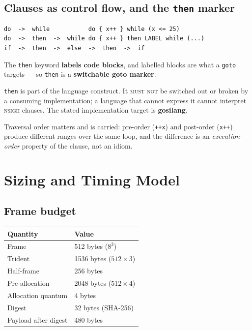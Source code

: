 \documentclass[11pt,a4paper]{article}
\newcommand{\MUSTNOT}{\textsc{must not}}
\newcommand{\NSIGII}{\textsc{nsigii}}
\begin{document}
\subsection{Clauses as control flow, and the \texttt{then} marker}
\label{sec:then}

\begin{Verbatim}[fontsize=\small,frame=single]
do  ->  while           do { x++ } while (x <= 25)
do  ->  then  ->  while do { x++ } then LABEL while (...)
if  ->  then  ->  else  ->  then  ->  if
\end{Verbatim}

\begin{ruleblock}
The \texttt{then} keyword \textbf{labels code blocks}, and labelled blocks are
what a \texttt{goto} targets --- so \texttt{then} is a \textbf{switchable goto
marker}.
\end{ruleblock}

\texttt{then} is part of the language construct. It \MUSTNOT{} be switched out
or broken by a consuming implementation; a language that cannot express it
cannot interpret \NSIGII{} clauses. The stated implementation target is
\textbf{gosilang}.

Traversal order matters and is carried: pre-order (\texttt{++x}) and post-order
(\texttt{x++}) produce different ranges over the same loop, and the difference
is an \emph{execution-order} property of the clause, not an idiom.

\section{Sizing and Timing Model}

\subsection{Frame budget}
\label{sec:budget}

\begin{center}
\begin{tabular}{@{}ll@{}}
\toprule
\textbf{Quantity} & \textbf{Value} \\
\midrule
Frame & 512 bytes ($8^{3}$) \\
Trident & 1536 bytes ($512 \times 3$) \\
Half-frame & 256 bytes \\
Pre-allocation & 2048 bytes ($512 \times 4$) \\
Allocation quantum & 4 bytes \\
Digest & 32 bytes (SHA-256) \\
Payload after digest & 480 bytes \\
\bottomrule
\end{tabular}
\end{center}
\end{document}
